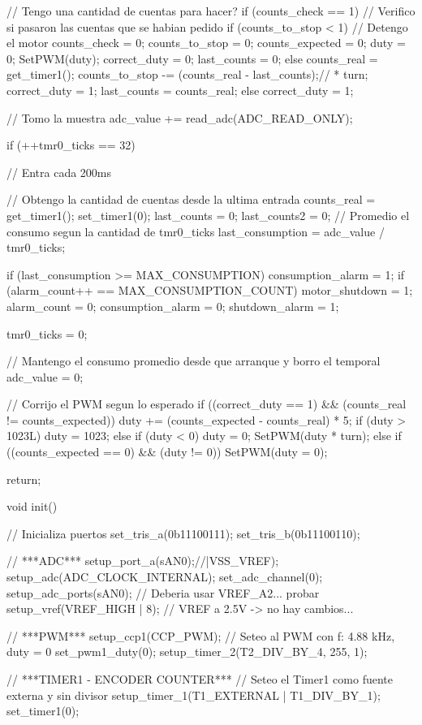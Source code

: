 {\begin{verbatimtab}
{	// Tengo una cantidad de cuentas para hacer?
	if (counts_check == 1)
	{
		// Verifico si pasaron las cuentas que se habian pedido
		if (counts_to_stop < 1)
		{
			// Detengo el motor
			counts_check = 0;
			counts_to_stop = 0;
			counts_expected = 0;
			duty = 0;
			SetPWM(duty);
			correct_duty = 0;
			last_counts = 0;
		} else {
			counts_real = get_timer1();
			counts_to_stop -= (counts_real - last_counts);// * turn;
			correct_duty = 1;
			last_counts = counts_real;
		}
	} else {
		correct_duty = 1;
	}
	
	// Tomo la muestra
	adc_value += read_adc(ADC_READ_ONLY);
	
	if (++tmr0_ticks == 32)
	{
		// Entra cada 200ms

		// Obtengo la cantidad de cuentas desde la ultima entrada
		counts_real = get_timer1();
		set_timer1(0);
		last_counts = 0;
		last_counts2 = 0;
		// Promedio el consumo segun la cantidad de tmr0_ticks
		last_consumption = adc_value / tmr0_ticks;
		
		if (last_consumption >= MAX_CONSUMPTION)
		{
			consumption_alarm = 1;
			if (alarm_count++ == MAX_CONSUMPTION_COUNT)
			{
				motor_shutdown = 1;
				alarm_count = 0;
				consumption_alarm = 0;
				shutdown_alarm = 1;
			}	
		}
		
		tmr0_ticks = 0;

		// Mantengo el consumo promedio desde que arranque y borro el temporal
		adc_value = 0;

		// Corrijo el PWM segun lo esperado
		if ((correct_duty == 1) && (counts_real != counts_expected))
		{
			duty += (counts_expected - counts_real) * 5;
			if (duty > 1023L)
				duty = 1023;
			else if (duty < 0)
				duty = 0;
			SetPWM(duty * turn);
		} else if ((counts_expected == 0) && (duty != 0)) {		
			SetPWM(duty = 0);
		}	
	}
	return;
}

void init()
{
	// Inicializa puertos
	set_tris_a(0b11100111);
	set_tris_b(0b11100110);

	// ***ADC***
	setup_port_a(sAN0);//|VSS_VREF);
	setup_adc(ADC_CLOCK_INTERNAL);
	set_adc_channel(0);
	setup_adc_ports(sAN0);
	// Deberia usar VREF_A2... probar
	setup_vref(VREF_HIGH | 8); // VREF a 2.5V -> no hay cambios...
	
	// ***PWM***
	setup_ccp1(CCP_PWM);
	// Seteo al PWM con f: 4.88 kHz, duty = 0
	set_pwm1_duty(0);
	setup_timer_2(T2_DIV_BY_4, 255, 1);

	// ***TIMER1 - ENCODER COUNTER***
	// Seteo el Timer1 como fuente externa y sin divisor
	setup_timer_1(T1_EXTERNAL | T1_DIV_BY_1);
	set_timer1(0);

}
\end{verbatimtab}}
